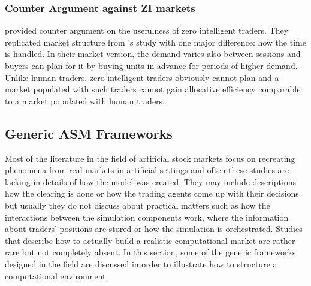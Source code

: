\subsubsection{Counter Argument against ZI markets}
\citet{Mil08} provided counter argument on the usefulness of zero
intelligent traders. They replicated market structure from
\citeauthor{God93}'s study with one major difference: how the 
time is handled. In their market version, the demand varies
also between sessions and buyers can plan for it by buying units
in advance for periods of higher demand. Unlike human traders,
zero intelligent traders obviously cannot plan and a market
populated with such traders cannot gain allocative efficiency comparable
to a market populated with human traders. 


\subsection{Generic ASM Frameworks}

Most of the literature in the field of artificial stock markets 
focus on recreating phenomena from real markets in artificial settings
and often these studies are lacking in details of how the model was created.
They may include descriptions how the clearing is done or how the trading agents 
come up with their decisions but usually they do not discuss about practical matters 
such as how the interactions between the simulation components work, where the 
information about traders' positions are stored or how the simulation is orchestrated. 
Studies that describe how to actually build a realistic computational 
market are rather rare but not completely absent. In this section, some of the 
generic frameworks designed in the field are discussed in order to illustrate how 
to structure a computational environment.


